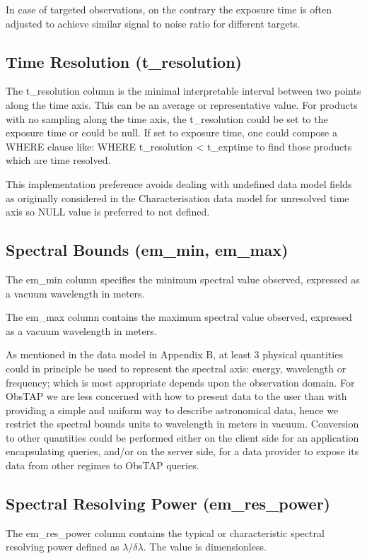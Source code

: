 \documentclass[11pt,a4paper]{ivoa}
\begin{document}
In case of targeted observations, on the contrary the exposure time is often adjusted to achieve similar signal to noise
ratio for different targets.

\subsection{Time Resolution (t\_resolution)}
The t\_resolution column is the minimal interpretable interval between two points along the time axis.  This can be an
average or representative value.  For products with no sampling along the time axis, the t\_resolution could be set to
the exposure time or could be null.  If set to exposure time, one could compose a WHERE clause like: WHERE
t\_resolution {\textless} t\_exptime  to find those products which are time resolved.

This implementation preference avoids dealing with undefined data model fields as originally considered in the
Characterisation data model for unresolved time axis so NULL value is preferred to not defined.

\subsection{Spectral Bounds (em\_min, em\_max)}
\label{bkm:Ref285651639}The em\_min column specifies the minimum spectral value observed, expressed as a vacuum
wavelength in meters.

The em\_max column contains the maximum spectral value observed, expressed as a vacuum wavelength in meters.

As mentioned in the data model in Appendix B, at least 3 physical quantities could in principle be used to represent the
spectral axis: energy, wavelength or frequency; which is most appropriate depends upon the observation domain.  For
ObsTAP we are less concerned with how to present data to the user than with providing a simple and uniform way to
describe astronomical data, hence we restrict the spectral bounds units to wavelength in meters in vacuum.  Conversion
to other quantities could be performed either on the client side for an application encapsulating queries, and/or on
the server side, for a data provider to expose its data from other regimes to ObsTAP queries.

\subsection{Spectral Resolving Power (em\_res\_power)}
The em\_res\_power column contains the typical or characteristic spectral resolving power defined as
${\lambda}/{\delta}{\lambda}$.  The value is dimensionless.
\end{document}
